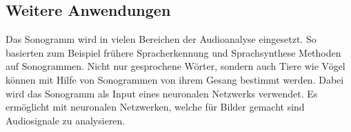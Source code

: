 \subsection{Weitere Anwendungen}
Das Sonogramm wird in vielen Bereichen der Audioanalyse eingesetzt.
So basierten zum Beispiel frühere Spracherkennung und Sprachsynthese Methoden 
%
%
auf Sonogrammen.
Nicht nur gesprochene Wörter, sondern auch Tiere wie Vögel können mit Hilfe
von Sonogrammen von ihrem Gesang bestimmt werden.
Dabei wird das Sonogramm als Input eines neuronalen Netzwerks verwendet.
%
Es ermöglicht mit neuronalen Netzwerken, welche für Bilder gemacht sind
Audiosignale zu analysieren.
